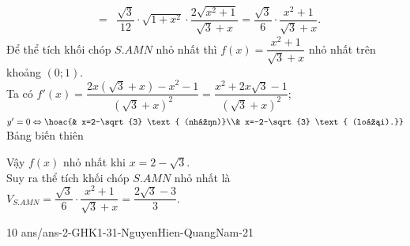 \begin{ex}
{\begin{eqnarray*}
			&= & \dfrac{\sqrt{3}}{12}\cdot \sqrt{1+x^2}\cdot \dfrac{2\sqrt{x^2+1}}{\sqrt{3}+x}=\dfrac{\sqrt{3}}{6}\cdot \dfrac{x^2+1}{\sqrt{3}+x}.
		\end{eqnarray*}
		Để thể tích khối chóp $S.AMN$ nhỏ nhất thì $f(x)=\dfrac{x^2+1}{\sqrt{3}+x}$ nhỏ nhất trên khoảng $(0;1)$.\\
		Ta có $f'(x)=\dfrac{2x(\sqrt{3}+x)-x^2-1}{(\sqrt{3}+x)^2}=\dfrac{x^2+2x\sqrt{3}-1}{(\sqrt{3}+x)^2}$; $y'=0 \Leftrightarrow \hoac{& x=2-\sqrt{3} \text{ (nhận)}\\& x=-2-\sqrt{3} \text{ (loại).}}$\\
		Bảng biến thiên
		\begin{center}
		\end{center}
		Vậy $f(x)$ nhỏ nhất khi $x=2-\sqrt{3}$.\\
		Suy ra thể tích khối chóp $S.AMN$ nhỏ nhất là $V_{S.AMN}=\dfrac{\sqrt{3}}{6}\cdot \dfrac{x^2+1}{\sqrt{3}+x}=\dfrac{2\sqrt{3}-3}{3}$.
	}
\end{ex}

\begin{indapan}{10}
	{ans/ans-2-GHK1-31-NguyenHien-QuangNam-21}
\end{indapan}

